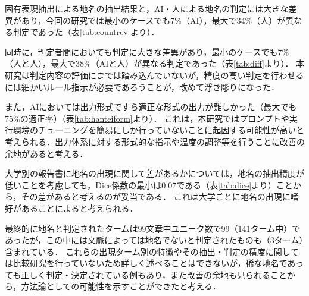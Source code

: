 固有表現抽出による地名の抽出結果と，AI・人による地名の判定には大きな差異があり，今回の研究では最小のケースでも7\%（AI），最大で34\%（人）が異なる判定であった（表\ref{tab:countrev}より）．

同時に，判定者間においても判定に大きな差異があり，最小のケースでも7\%（人と人），最大で38\%（AIと人）が異なる判定であった（表\ref{tab:diff}より）．
本研究は判定内容の評価にまでは踏み込んでいないが，精度の高い判定を行わせるには細かいルール指示が必要であろうことが，改めて浮き彫りになった．

また，AIにおいては出力形式ですら適正な形式の出力が難しかった（最大でも75\%の適正率）（表\ref{tab:hanteiform}より）．
これは，本研究ではプロンプトや実行環境のチューニングを簡易にしか行っていないことに起因する可能性が高いと考えられる．出力体系に対する形式的な指示や温度の調整等を行うことに改善の余地があると考える．

大学別の報告書に地名の出現に関して差があるかについては，地名の抽出精度が低いことを考慮しても，Dice係数の最小は0.07である（表\ref{tab:dice}より）ことから，その差があると考えるのが妥当である．
これは大学ごとに地名の出現に嗜好があることによると考えられる．

最終的に地名と判定されたタームは99文章中ユニーク数で99（141ターム中）であったが，この中には文脈によっては地名でないと判定されたものも（3ターム）含まれている．
これらの出現ターム別の特徴やその抽出・判定の精度に関しては比較研究を行っていないため詳しく述べることはできないが，稀な地名であっても正しく判定・決定されている例もあり，また改善の余地も見られることから，方法論としての可能性を示すことができたと考える．
